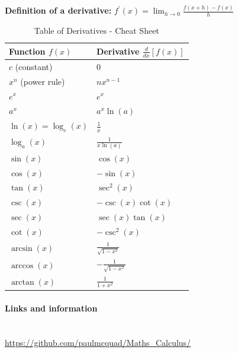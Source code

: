 \documentclass[10pt,lucida]{article}
\author{Paul McQuade}
\date{}
\newcommand{\sectiontitle}[1]{\paragraph{#1} \ \\} %
\begin{document}
	
	
	
	
	
	\begin{center}
		\textbf{Definition of a derivative:}
		$f^\prime(x) = \lim_{h \to 0} \frac{f(x+h) - f(x)}{h}$ 
	\end{center}
	
	\begin{table}[htbp]
		\centering
		\caption{Table of Derivatives - Cheat Sheet}
		\begin{tabular}{ll}
			\toprule
			\textbf{Function $f(x)$} & \textbf{Derivative $\frac{d}{dx}[f(x)]$} \\
			\midrule
			$c$ (constant) & $0$ \\
			$x^n$ (power rule) & $nx^{n-1}$ \\
			$e^x$ & $e^x$ \\
			$a^x$ & $a^x \ln(a)$ \\
			$\ln(x) = \log_e(x)$ & $\frac{1}{x}$ \\
			$\log_a(x)$ & $\frac{1}{x \ln(a)}$ \\
			\midrule
			$\sin(x)$ & $\cos(x)$ \\
			$\cos(x)$ & $-\sin(x)$ \\
			$\tan(x)$ & $\sec^2(x)$ \\
			$\csc(x)$ & $-\csc(x)\cot(x)$ \\
			$\sec(x)$ & $\sec(x)\tan(x)$ \\
			$\cot(x)$ & $-\csc^2(x)$ \\
			\midrule
			$\arcsin(x)$ & $\frac{1}{\sqrt{1-x^2}}$ \\
			$\arccos(x)$ & $-\frac{1}{\sqrt{1-x^2}}$ \\
			$\arctan(x)$ & $\frac{1}{1+x^2}$ \\
			\bottomrule
		\end{tabular}
	\end{table}
	
	
	\sectiontitle{Links and information}
	
	\url{https://github.com/paulmcquad/Maths_Calculus/}
	
\end{document}
